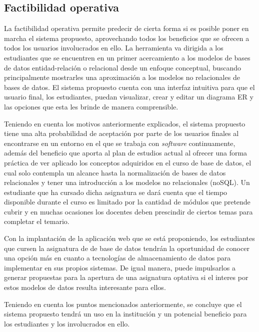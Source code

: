 
\subsection*{Factibilidad operativa}


La factibilidad operativa permite predecir de cierta forma si es posible poner en marcha el sistema propuesto, aprovechando todos los beneficios que se ofrecen a todos los usuarios involucrados en ello. La herramienta va dirigida a los estudiantes que se encuentren en un primer acercamiento a los modelos de bases de datos entidad-relación o relacional desde un enfoque conceptual, buscando principalmente mostrarles una aproximación a los modelos no relacionales de bases de datos. El sistema propuesto cuenta con una interfaz intuitiva para que el usuario final, los estudiantes, puedan visualizar, crear y editar un diagrama ER y las opciones que esta les brinde de manera comprensible.


Teniendo en cuenta los motivos anteriormente explicados, el sistema propuesto tiene una alta probabilidad de aceptación por parte de los usuarios finales al encontrarse en un entorno en el que se trabaja con \textit{software} continuamente, además del beneficio que aporta al plan de estudios actual al ofrecer una forma práctica de ver aplicado los conceptos adquiridos en el curso de base de datos, el cual solo contempla un alcance hasta la normalización de bases de datos relacionales y tener una introducción a los modelos no relacionales (noSQL). Un estudiante que ha cursado dicha asignatura se dará cuenta que el tiempo disponible durante el curso es limitado por la cantidad de módulos que pretende cubrir y en muchas ocasiones los docentes deben prescindir de ciertos temas para completar el temario.

Con la implantación de la aplicación web que se está proponiendo, los estudiantes que cursen la asignatura de de base de datos tendrán la oportunidad de conocer una opción más en cuanto a tecnologías de almacenamiento de datos para implementar en sus propios sistemas. De igual manera, puede impulsarlos a generar propuestas para la apertura de una asignatura optativa si el interes por estos modelos de datos resulta interesante para ellos.

Teniendo en cuenta los puntos mencionados anteriormente, se concluye que el sistema propuesto tendrá un uso en la institución y un potencial beneficio para los estudiantes y los involucrados en ello.

